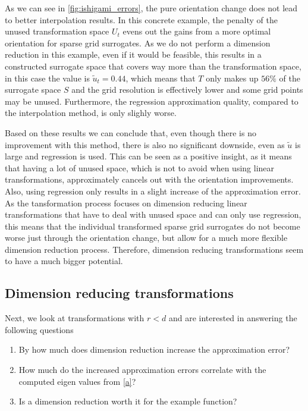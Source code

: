 \documentclass[
  a4paper,  %
  twoside,  %
  bibliography=totoc,
  headsepline,
  cleardoublepage=empty,
  parskip=half,
  draft=false
]{scrbook}
\begin{document}
As we can see in \cref{fig:ishigami_errors}, the pure orientation change does not lead to better interpolation results.
In this concrete example, the penalty of the unused transformation space $U_t$ evens out the gains from a more optimal orientation for sparse grid surrogates.
As we do not perform a dimension reduction in this example, even if it would be feasible, this results in a constructed surrogate space that covers way more than the transformation space, in this case the value is $\tilde{u}_t=0.44$, which means that $T$ only makes up $56\%$ of the surrogate space $S$ and the grid resolution is effectively lower and some grid points may be unused.
Furthermore, the regression approximation quality, compared to the interpolation method, is only slighly worse.

Based on these results we can conclude that, even though there is no improvement with this method, there is also no significant downside, even as $\tilde{u}$ is large and regression is used.
This can be seen as a positive insight, as it means that having a lot of unused space, which is not to avoid when using linear transformations, approximately cancels out with the orientation improvements.
Also, using regression only results in a slight increase of the approximation error.
As the tansformation process focuses on dimension reducing linear transformations that have to deal with unused space and can only use regression, this means that the individual transformed sparse grid surrogates do not become worse just through the orientation change, but allow for a much more flexible dimension reduction process.
Therefore, dimension reducing transformations seem to have a much bigger potential.

\subsection{Dimension reducing transformations}

Next, we look at transformations with $r < d$ and are interested in answering the following questions
\begin{enumerate}
\item By how much does dimension reduction increase the approximation error?
\item How much do the increased approximation errors correlate with the computed eigen values from \cref{a}?
\item Is a dimension reduction worth it for the example function?
\end{enumerate}
\end{document}
